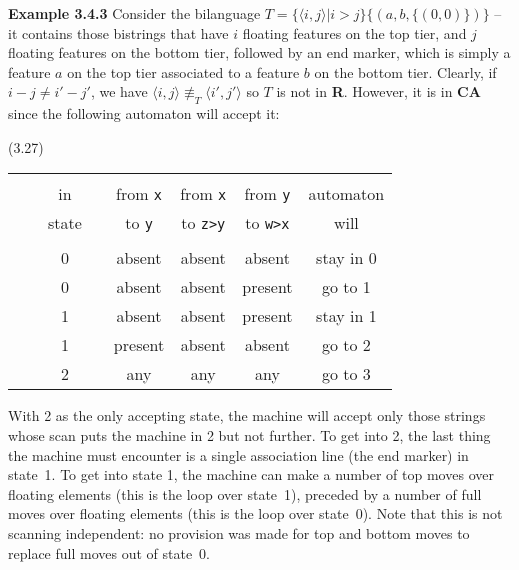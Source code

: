 \smallskip\noindent
{\bf Example 3.4.3} Consider the bilanguage $T = \{\langle i,j\rangle |
i>j\}\{(a,b,\{(0,0)\})\}$ -- it contains those bistrings that have $i$
floating features on the top tier, and $j$ floating features on the bottom
tier, followed by an end marker, which is simply a feature $a$ on the top tier
associated to a feature $b$ on the bottom tier.  Clearly, if $i-j \neq i'-j'$,
we have $\langle i,j\rangle \not\equiv_T \langle i',j'\rangle $ so $T$ is not
in {\bf R}. However, it is in {\bf CA} since the following automaton will
accept it:

\hfill (3.27)\\
\begin{tabular}{lccccccc}
&&&&&&&\\
&&in&&from {\tt x}\phantom{m} &\phantom{m} from {\tt x}\phantom{m} &\phantom{m} from {\tt y}\phantom{m} &\phantom{m} automaton\\
&&state&& to {\tt y} & to {\tt z>y} & to {\tt w>x} & will\\
&&&&&&&\\
&&0&&absent&absent&absent&stay in 0\\
&&0&&absent&absent&present&go to 1\\
&&1&&absent&absent&present&stay in 1\\
&&1&&present&absent&absent&go to 2\\
&&2&&any&any&any&go to 3\\
\end{tabular}

\medskip\noindent
With 2 as the only accepting state, the machine will accept only those strings
whose scan puts the machine in 2 but not further. To get into 2, the last
thing the machine must encounter is a single association line (the end marker)
in state~1. To get into state 1, the machine can make a number of top moves
over floating elements (this is the loop over state~1), preceded by a number of
full moves over floating elements (this is the loop over state~0). Note that
this is not scanning independent: no provision was made for top and bottom
moves to replace full moves out of state~0.

